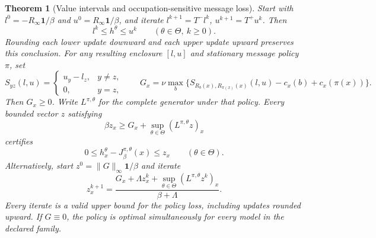\documentclass[11pt]{article}
\theoremstyle{plain}
\newtheorem{theorem}{Theorem}[section]
\theoremstyle{definition}
\theoremstyle{remark}
\begin{document}
\begin{theorem}[Value intervals and occupation-sensitive message loss]
\label{thm:intervalcontrol}
Start with \(l^0=-R_\infty\mathbf1/\beta\) and
\(u^0=R_\infty\mathbf1/\beta\), and iterate
\(l^{k+1}=T^-l^k\), \(u^{k+1}=T^+u^k\). Then
\[
 l^k\le h^\theta\le u^k\qquad(\theta\in\Theta,\ k\ge0).
\]
Rounding each lower update downward and each upper update upward
preserves this conclusion. For any resulting enclosure \([l,u]\)
and stationary message policy \(\pi\), set
\[
 S_{yz}(l,u)=
 \begin{cases}u_y-l_z,&y\ne z,\\0,&y=z,\end{cases}
 \qquad
 G_x=\nu\max_b
 \{S_{R_b(x),R_{\pi(x)}(x)}(l,u)-c_x(b)+c_x(\pi(x))\}.
\]
Then \(G_x\ge0\). Write \(L^{\pi,\theta}\) for the complete generator
under that policy. Every bounded vector \(z\) satisfying
\begin{equation}\label{eq:losssupersolution}
 \beta z_x\ge G_x+\sup_{\theta\in\Theta}(L^{\pi,\theta}z)_x
\end{equation}
certifies
\[
 0\le h_x^\theta-J_\beta^{\pi,\theta}(x)\le z_x
 \qquad(\theta\in\Theta).
\]
Alternatively, start \(z^0=\|G\|_\infty\mathbf1/\beta\) and iterate
\begin{equation}\label{eq:occupationenclosure}
 z^{k+1}_x=
 \frac{G_x+\Lambda z^k_x+
                  \sup_{\theta\in\Theta}(L^{\pi,\theta}z^k)_x}
      {\beta+\Lambda}.
\end{equation}
Every iterate is a valid upper bound for the policy loss, including
updates rounded upward. If \(G\equiv0\), the policy is optimal
simultaneously for every model in the declared family.
\end{theorem}
\end{document}

